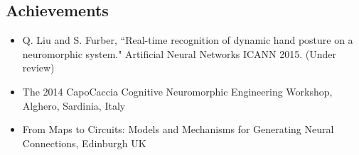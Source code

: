 \documentclass[journal]{journal}
\begin{document}
\subsection{Achievements}
\begin{itemize}

	\item Q. Liu and S. Furber, ``Real-time recognition of dynamic hand posture on a neuromorphic system." Artificial Neural Networks ICANN 2015. (Under review)


%
	\item The 2014 CapoCaccia Cognitive Neuromorphic Engineering Workshop,
	Alghero, Sardinia, Italy 
	\item From Maps to Circuits: Models and Mechanisms for Generating Neural Connections, Edinburgh UK
\end{itemize}
\end{document}
